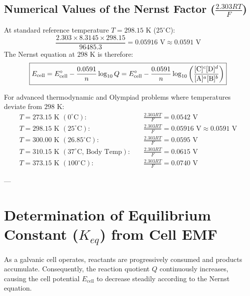 \subsection{Numerical Values of the Nernst Factor ($\frac{2.303 RT}{F}$)}
At standard reference temperature $T = 298.15\text{ K}$ ($25^\circ\text{C}$):
\begin{equation}
    \frac{2.303 \times 8.3145 \times 298.15}{96485.3} = 0.05916\text{ V} \approx 0.0591\text{ V}
\end{equation}
The Nernst equation at $298\text{ K}$ is therefore:
\begin{equation}
    \boxed{E_{\text{cell}} = E^\circ_{\text{cell}} - \frac{0.0591}{n} \log_{10} Q = E^\circ_{\text{cell}} - \frac{0.0591}{n} \log_{10} \left( \frac{[\ce{C}]^c [\ce{D}]^d}{[\ce{A}]^a [\ce{B}]^b} \right)}
\end{equation}
\begin{conceptbox}
For advanced thermodynamic and Olympiad problems where temperatures deviate from $298\text{ K}$:
\begin{align*}
    T = 273.15\text{ K } (0^\circ\text{C}): \quad & \frac{2.303 RT}{F} = 0.0542\text{ V} \\
    T = 298.15\text{ K } (25^\circ\text{C}): \quad & \frac{2.303 RT}{F} = 0.05916\text{ V} \approx 0.0591\text{ V} \\
    T = 300.00\text{ K } (26.85^\circ\text{C}): \quad & \frac{2.303 RT}{F} = 0.0595\text{ V} \\
    T = 310.15\text{ K } (37^\circ\text{C, Body Temp}): \quad & \frac{2.303 RT}{F} = 0.0615\text{ V} \\
    T = 373.15\text{ K } (100^\circ\text{C}): \quad & \frac{2.303 RT}{F} = 0.0740\text{ V}
\end{align*}
\end{conceptbox}

---

\section{Determination of Equilibrium Constant ($K_{eq}$) from Cell EMF}

As a galvanic cell operates, reactants are progressively consumed and products accumulate. Consequently, the reaction quotient $Q$ continuously increases, causing the cell potential $E_{\text{cell}}$ to decrease steadily according to the Nernst equation.

